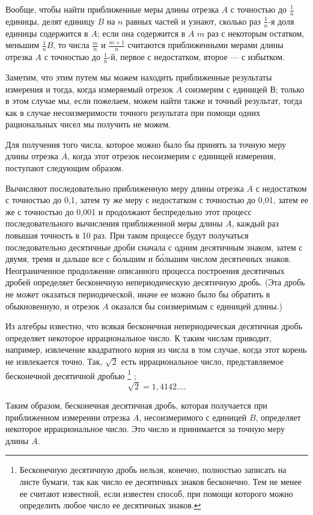 \documentclass[oneside]{book}
\begin{document}
Вообще, чтобы найти приближенные меры длины отрезка $A$ с точностью до $\tfrac1n$ единицы, делят единицу $B$ на $n$ равных частей и узнают, сколько раз $\tfrac1n$-я доля единицы содержится в $A$;
если она содержится в $A$ $m$ %
раз с некоторым остатком, меньшим $\tfrac1n B$, то числа $\tfrac mn$ и $\tfrac {m+1}n$ считаются приближенными мерами длины отрезка $A$ с точностью до $\tfrac1n$-й, первое с недостатком, второе — с избытком.

Заметим, что этим путем мы можем находить приближенные результаты измерения и тогда, когда измеряемый отрезок $A$ соизмерим с единицей В;
только в этом случае мы, если пожелаем, можем найти также и точный результат, тогда как в случае несоизмеримости точного результата при помощи одних рациональных чисел мы получить не можем.

Для получения того числа, которое можно было бы принять за точную меру длины отрезка $A$, когда этот отрезок несоизмерим с единицей измерения, поступают следующим образом.

Вычисляют последовательно приближенную меру длины отрезка $A$ с недостатком с точностью до 0,1, затем ту же меру с недостатком с точностью до 0,01, затем ее же с точностью до 0,001 и продолжают беспредельно этот процесс последовательного вычисления приближенной меры длины $A$, каждый раз повышая точность в 10 раз.
При таком процессе будут получаться последовательно десятичные дроби сначала с одним десятичным знаком, затем с двумя, тремя и дальше все с б\'{о}льшим и б\'{о}льшим числом десятичных знаков.
Неограниченное продолжение описанного процесса построения десятичных дробей определяет бесконечную непериодическую десятичную дробь.
(Эта дробь не может оказаться периодической, иначе ее можно было бы обратить в обыкновенную, и отрезок $A$ оказался бы соизмеримым с единицей длины.)

Из алгебры известно, что всякая бесконечная непериодическая десятичная дробь определяет некоторое иррациональное число.
К таким числам приводит, например, извлечение квадратного корня из числа в том случае, когда этот корень не извлекается точно.
Так, $\sqrt{2}$ есть иррациональное число, представляемое бесконечной десятичной дробью%
\footnote{Бесконечную десятичную дробь нельзя, конечно, полностью записать на листе бумаги, так как число ее десятичных знаков бесконечно.
Тем не менее ее считают известной, если известен способ, при помощи которого можно определить любое число ее десятичных знаков.}%
;
\[\sqrt{2}  = 1,4142\dots .\]

Таким образом, бесконечная десятичная дробь, которая получается при приближенном измерении отрезка $A$, несоизмеримого с единицей $B$, определяет некоторое иррациональное число.
Это число и принимается за точную меру длины $A$.
\end{document}
